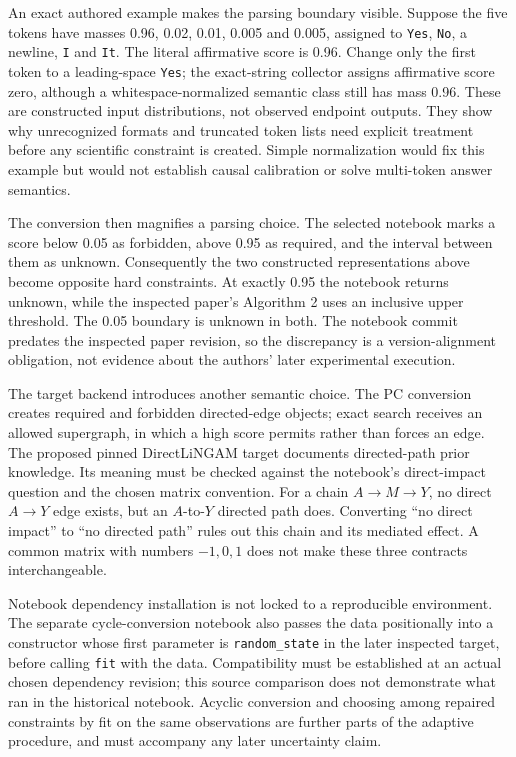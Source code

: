 An exact authored example makes the parsing boundary visible. Suppose
the five tokens have masses 0.96, 0.02, 0.01, 0.005 and 0.005, assigned
to \texttt{Yes}, \texttt{No}, a newline, \texttt{I} and \texttt{It}. The
literal affirmative score is 0.96. Change only the first token to a
leading-space \texttt{Yes}; the exact-string collector assigns
affirmative score zero, although a whitespace-normalized semantic class
still has mass 0.96. These are constructed input distributions, not
observed endpoint outputs. They show why unrecognized formats and
truncated token lists need explicit treatment before any scientific
constraint is created. Simple normalization would fix this example but
would not establish causal calibration or solve multi-token answer
semantics. \citep{exec14_iid_oracle}

The conversion then magnifies a parsing choice. The selected notebook
marks a score below 0.05 as forbidden, above 0.95 as required, and the
interval between them as unknown. Consequently the two constructed
representations above become opposite hard constraints. At exactly 0.95
the notebook returns unknown, while the inspected paper's Algorithm 2
uses an inclusive upper threshold. The 0.05 boundary is unknown in both.
The notebook commit predates the inspected paper revision, so the
discrepancy is a version-alignment obligation, not evidence about the
authors' later experimental execution.
\citep{exec14_iid_scd,v12_la_2402_01454}

The target backend introduces another semantic choice. The PC conversion
creates required and forbidden directed-edge objects; exact search
receives an allowed supergraph, in which a high score permits rather
than forces an edge. The proposed pinned DirectLiNGAM target documents
directed-path prior knowledge. Its meaning must be checked against the
notebook's direct-impact question and the chosen matrix convention. For
a chain \(A\to M\to Y\), no direct \(A\to Y\) edge exists, but an
\(A\)-to-\(Y\) directed path does. Converting ``no direct impact'' to
``no directed path'' rules out this chain and its mediated effect. A
common matrix with numbers \(-1,0,1\) does not make these three
contracts interchangeable. \citep{exec14_iid_scd,v13_sw_lingam}

Notebook dependency installation is not locked to a reproducible
environment. The separate cycle-conversion notebook also passes the data
positionally into a constructor whose first parameter is
\texttt{random\_state} in the later inspected target, before calling
\texttt{fit} with the data. Compatibility must be established at an
actual chosen dependency revision; this source comparison does not
demonstrate what ran in the historical notebook. Acyclic conversion and
choosing among repaired constraints by fit on the same observations are
further parts of the adaptive procedure, and must accompany any later
uncertainty claim. \citep{exec14_iid_scd,v13_sw_lingam}

